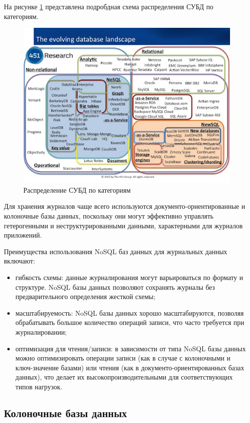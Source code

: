 \documentclass[14pt, russian]{scrartcl}
\begin{document}
На рисунке \ref{fig:dblandscape} представлена подробдная схема распределения СУБД по категориям.

\begin{figure}[H]
	\centering
	\begin{minipage}[t]{.9\textwidth}
		\centering
		\includegraphics[width=.7\textwidth]{./imgs/dblandscape.jpg}
	\end{minipage}
	\caption{Распределение СУБД по категориям}
	\label{fig:dblandscape}
\end{figure}


Для хранения журналов чаще всего используются документо-ориентированные и колоночные базы данных,
поскольку они могут эффективно управлять гетерогенными и неструктурированными данными, характерными для журналов приложений.

Преимущества использования NoSQL баз данных для журнальных данных включают:

\begin{itemize}

	\item гибкость схемы: данные журналирования могут варьироваться по формату и структуре. NoSQL базы данных позволяют сохранять журналы без предварительного определения жесткой схемы;
	\item масштабируемость: NoSQL базы данных хорошо масштабируются, позволяя обрабатывать большое количество операций записи, что часто требуется при журналировании;
	\item оптимизация для чтения/записи: в зависимости от типа NoSQL базы данных можно оптимизировать операции записи (как в случае с колоночными и ключ-значение базами) или чтения (как в документо-ориентированных базах данных), что делает их высокопроизводительными для соответствующих типов нагрузок.
\end{itemize}

\subsection{Колоночные базы данных}
\end{document}
